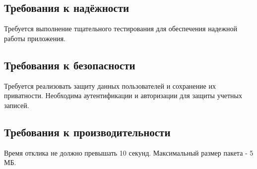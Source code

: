 \documentclass[../document.tex]{subfiles}
\begin{document}
\subsection{Требования к надёжности}
\par Требуется выполнение тщательного тестирования для обеспечения надежной работы приложения.
\subsection{Требования к безопасности}
\par Требуется реализовать защиту данных пользователей и сохранение их приватности. Необходима аутентификации и авторизации для защиты учетных записей.
\subsection{Требования к производительности}
\par Время отклика не должно превышать 10 секунд. Максимальный размер пакета - 5 МБ.
\end{document}
